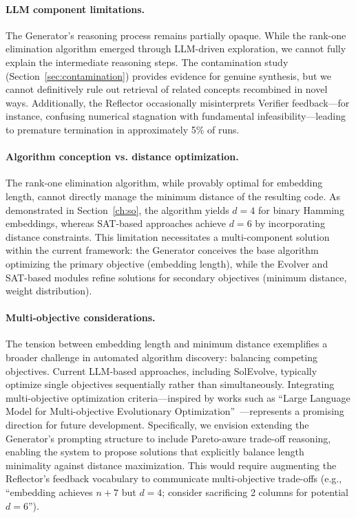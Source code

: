 \paragraph{LLM component limitations.} The Generator's reasoning process remains partially opaque. While the rank-one elimination algorithm emerged through LLM-driven exploration, we cannot fully explain the intermediate reasoning steps. The contamination study (Section~\ref{sec:contamination}) provides evidence for genuine synthesis, but we cannot definitively rule out retrieval of related concepts recombined in novel ways. Additionally, the Reflector occasionally misinterprets Verifier feedback---for instance, confusing numerical stagnation with fundamental infeasibility---leading to premature termination in approximately 5\% of runs.

\paragraph{Algorithm conception vs. distance optimization.} The rank-one elimination algorithm, while provably optimal for embedding length, cannot directly manage the minimum distance of the resulting code. As demonstrated in Section~\ref{ch:so}, the algorithm yields $d=4$ for binary Hamming embeddings, whereas SAT-based approaches achieve $d=6$ by incorporating distance constraints. This limitation necessitates a multi-component solution within the current framework: the Generator conceives the base algorithm optimizing the primary objective (embedding length), while the Evolver and SAT-based modules refine solutions for secondary objectives (minimum distance, weight distribution).

\paragraph{Multi-objective considerations.} The tension between embedding length and minimum distance exemplifies a broader challenge in automated algorithm discovery: balancing competing objectives. Current LLM-based approaches, including SolEvolve, typically optimize single objectives sequentially rather than simultaneously. Integrating multi-objective optimization criteria---inspired by works such as ``Large Language Model for Multi-objective Evolutionary Optimization''~\cite{Liu2023LLMMOO}---represents a promising direction for future development. Specifically, we envision extending the Generator's prompting structure to include Pareto-aware trade-off reasoning, enabling the system to propose solutions that explicitly balance length minimality against distance maximization. This would require augmenting the Reflector's feedback vocabulary to communicate multi-objective trade-offs (e.g., ``embedding achieves $n+7$ but $d=4$; consider sacrificing 2 columns for potential $d=6$'').

